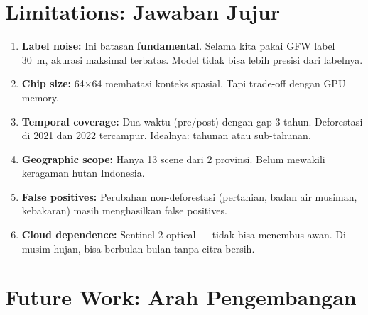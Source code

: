 \documentclass[10pt,a4paper,onecolumn]{article}
\begin{document}
\section{Limitations: Jawaban Jujur}

\begin{enumerate}[nosep]
    \item \textbf{Label noise:} Ini batasan \textbf{fundamental}.
          Selama kita pakai GFW label 30~m, akurasi maksimal terbatas.
          Model tidak bisa lebih presisi dari labelnya.
    \item \textbf{Chip size:} 64$\times$64 membatasi konteks spasial.
          Tapi trade-off dengan GPU memory.
    \item \textbf{Temporal coverage:} Dua waktu (pre/post) dengan
          gap 3 tahun. Deforestasi di 2021 dan 2022 tercampur.
          Idealnya: tahunan atau sub-tahunan.
    \item \textbf{Geographic scope:} Hanya 13 scene dari 2 provinsi.
          Belum mewakili keragaman hutan Indonesia.
    \item \textbf{False positives:} Perubahan non-deforestasi
          (pertanian, badan air musiman, kebakaran) masih menghasilkan
          false positives.
    \item \textbf{Cloud dependence:} Sentinel-2 optical — tidak bisa
          menembus awan. Di musim hujan, bisa berbulan-bulan tanpa
          citra bersih.
\end{enumerate}

\section{Future Work: Arah Pengembangan}
\end{document}
